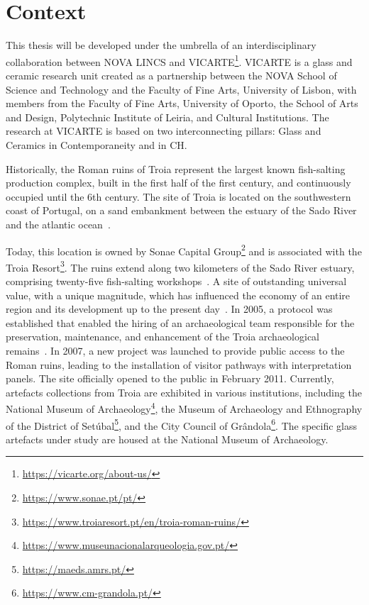 \section{Context}
\label{sec:context}

This thesis will be developed under the umbrella of an interdisciplinary collaboration between NOVA LINCS and \gls{VICARTE}\footnote{\url{https://vicarte.org/about-us/}}.
\gls{VICARTE} is a glass and ceramic research unit created as a partnership between the NOVA School of Science and Technology and the Faculty of Fine Arts, University of Lisbon, with members from the Faculty of Fine Arts, University of Oporto, the School of Arts and Design, Polytechnic Institute of Leiria, and Cultural Institutions.
The research at \gls{VICARTE} is based on two interconnecting pillars: Glass and Ceramics in Contemporaneity and in \gls{CH}. 

Historically, the Roman ruins of Troia represent the largest known fish-salting production complex, built in the first half of the first century, and continuously occupied until the 6th century. 
The site of Troia is located on the southwestern coast of Portugal, on a sand embankment between the estuary of the Sado River and the atlantic ocean~\cite{pinto2018reassessment}.

Today, this location is owned by Sonae Capital Group\footnote{\url{https://www.sonae.pt/pt/}} and is associated with the Troia Resort\footnote{\url{https://www.troiaresort.pt/en/troia-roman-ruins/}}.
The ruins extend along two kilometers of the Sado River estuary, comprising twenty-five fish-salting workshops~\cite{hocquet2015fish}.
A site of outstanding  universal value, with a unique magnitude, which has influenced the economy of an entire region and its development up to the present day~\cite{unesco_troia}.
In 2005, a protocol was established that enabled the hiring of an archaeological team responsible for the preservation, maintenance, and enhancement of the Troia archaeological remains~\cite{pinto2014ruinas}. In 2007,
a new project was launched to provide public access to the Roman ruins, leading to the installation of visitor pathways with interpretation panels. The site officially opened to the public in February 2011. 
Currently, artefacts collections from Troia are exhibited in various institutions, including the National Museum of Archaeology\footnote{\url{https://www.museunacionalarqueologia.gov.pt/}}, the Museum of Archaeology and Ethnography of the District of Setúbal\footnote{\url{https://maeds.amrs.pt/}}, and the City Council of Grândola\footnote{\url{https://www.cm-grandola.pt/}}. The specific glass artefacts under study are housed at the National Museum of Archaeology.



